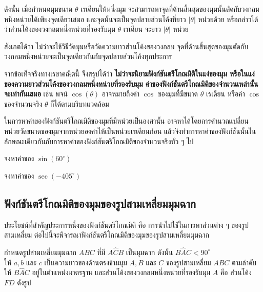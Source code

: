 \medskip

\noindent ดังนั้น เมื่อกำหนดมุมขนาด $\theta$ เรเดียนให้หนึ่งมุม จะสามารถหาจุดที่ด้านสิ้นสุดของมุมนั้นตัดกับวงกลมหนึ่งหน่วยได้เพียงจุดเดียวเสมอ และจุดนั้นจะเป็นจุดปลายส่วนโค้งที่ยาว $|\theta|$ หน่วยด้วย หรือกล่าวได้ว่าส่วนโค้งของวงกลมหนึ่งหน่วยที่รองรับมุม $\theta$ เรเดียน จะยาว $|\theta|$ หน่วย

\medskip

\noindent สังเกตได้ว่า ไม่ว่าจะใช้วิธีวัดมุมหรือวัดความยาวส่วนโค้งของวงกลม จุดที่ด้านสิ้นสุดของมุมตัดกับวงกลมหนึ่งหน่วยจะเป็นจุดเดียวกันกับจุดปลายส่วนโค้งทุกประการ

\medskip

\noindent จากข้อเท็จจริงทางเรขาคณิตนี้ จึงสรุปได้ว่า \textbf{ไม่ว่าจะนิยามฟังก์ชันตรีโกณมิติในแง่ของมุม หรือในแง่ของความยาวส่วนโค้งของวงกลมหนึ่งหน่วยที่รองรับมุม ค่าของฟังก์ชันตรีโกณมิติของจำนวนเหล่านั้นจะเท่ากันเสมอ} เช่น พจน์ $\cos(\theta)$ อาจหมายถึงค่า $\cos$ ของมุมที่มีขนาด $\theta$ เรเดียน หรือค่า $\cos$ ของจำนวนจริง $\theta$ ก็ได้ตามบริบทแวดล้อม

\medskip

\noindent ในการหาค่าของฟังก์ชันตรีโกณมิติของมุมที่มีหน่วยเป็นองศานั้น อาจหาได้โดยการคำนวณเปลี่ยนหน่วยวัดขนาดของมุมจากหน่วยองศาให้เป็นหน่วยเรเดียนก่อน แล้วจึงทำการหาค่าของฟังก์ชันนั้นในลักษณะเดียวกันกับการหาค่าของฟังก์ชันตรีโกณมิติของจำนวนจริงทั่ว ๆ ไป

\begin{examplebox}
	จงหาค่าของ $\sin \left( 60^{\circ}\right) $
\end{examplebox}
\solution
\vspace{7cm}

\begin{examplebox}
	จงหาค่าของ $\sec \left(-405^{\circ}\right)$
\end{examplebox}
\solution
\newpage

\subsection*{ฟังก์ชันตรีโกณมิติของมุมของรูปสามเหลี่ยมมุมฉาก}

ประโยชน์ที่สำคัญประการหนึ่งของฟังก์ชันตรีโกณมิติ คือ การนำไปใช้ในการหาส่วนต่าง ๆ ของรูปสามเหลี่ยม ต่อไปนี้จะพิจารณาฟังก์ชันตรีโกณมิติของมุมของรูปสามเหลี่ยมมุมฉาก

\vspace{0.5em}
\noindent กำหนดรูปสามเหลี่ยมมุมฉาก $ABC$ ที่มี $A\hat{C}B$ เป็นมุมฉาก ดังนั้น $B\hat{A}C < 90^{\circ}$
\\
ให้ $a, b$ และ $c$ เป็นความยาวของด้านตรงข้ามมุม $A, B$ และ $C$ ของรูปสามเหลี่ยม $ABC$ ตามลำดับ
\\
ให้ $B\hat{A}C$ อยู่ในตำแหน่งมาตรฐาน และส่วนโค้งของวงกลมหนึ่งหน่วยที่รองรับมุม $A$ คือ ส่วนโค้ง $FD$ ดังรูป

